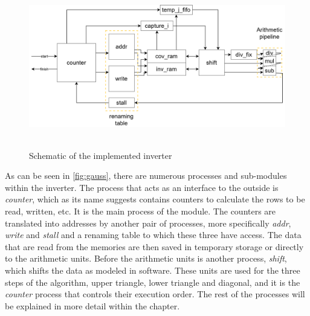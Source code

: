 \begin{figure}[h!]
\centering\textbf{
\includegraphics[height=2.5in]{figures/gauss.png}}
\caption{Schematic of the implemented inverter}
  \label{fig:gauss}
\end{figure}
As can be seen in \autoref{fig:gauss}, there are numerous processes and sub-modules within the inverter. The process that acts as an interface to the outside is \textit{counter}, which as its name suggests contains counters to calculate the rows to be read, written, etc. It is the main process of the module. The counters are translated into addresses by another pair of processes, more specifically \textit{addr}, \textit{write} and \textit{stall} and a renaming table to which these three have access. The data that are read from the memories are then saved in temporary storage or directly to the arithmetic units. Before the arithmetic units is another process, \textit{shift}, which shifts the data as modeled in software. These units are used for the three steps of the algorithm, upper triangle, lower triangle and diagonal, and it is the \textit{counter} process that controls their execution order. The rest of the processes will be explained in more detail within the chapter.


